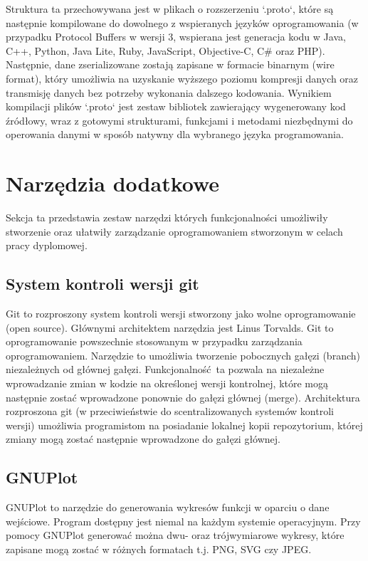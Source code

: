 \documentclass[a4paper,12pt,twoside,openany]{report}
\begin{document}
Struktura ta przechowywana jest w plikach o rozszerzeniu `.proto`, które są następnie kompilowane do dowolnego z wspieranych języków oprogramowania 
(w przypadku Protocol Buffers w wersji 3, wspierana jest generacja kodu w Java, C++, Python, Java Lite, Ruby, JavaScript, Objective-C, C\# oraz PHP).
Następnie, dane zserializowane zostają zapisane w formacie binarnym (wire format), który umożliwia na uzyskanie wyższego poziomu kompresji danych oraz transmisję danych 
bez potrzeby wykonania dalszego kodowania. 
Wynikiem kompilacji plików `.proto` jest zestaw bibliotek zawierający wygenerowany kod źródłowy, wraz z gotowymi strukturami, funkcjami i metodami niezbędnymi do 
operowania danymi w sposób natywny dla wybranego języka programowania.

\section{Narzędzia dodatkowe}

Sekcja ta przedstawia zestaw narzędzi których funkcjonalności umożliwiły stworzenie oraz ułatwiły zarządzanie oprogramowaniem stworzonym w celach
pracy dyplomowej. 

\subsection{System kontroli wersji git}
Git to rozproszony system kontroli wersji stworzony jako wolne oprogramowanie (open source). 
Głównymi architektem narzędzia jest Linus Torvalds. Git to oprogramowanie powszechnie stosowanym w przypadku zarządzania oprogramowaniem.
Narzędzie to umożliwia tworzenie pobocznych gałęzi (branch) niezależnych od głównej gałęzi. Funkcjonalność ta pozwala na niezależne wprowadzanie zmian
w kodzie na określonej wersji kontrolnej, które mogą następnie zostać wprowadzone ponownie do gałęzi głównej (merge).
Architektura rozproszona git (w przeciwieństwie do scentralizowanych systemów kontroli wersji) umożliwia programistom na posiadanie lokalnej kopii repozytorium,
której zmiany mogą zostać następnie wprowadzone do gałęzi głównej.

\subsection{GNUPlot}

GNUPlot to narzędzie do generowania wykresów funkcji w oparciu o dane wejściowe. Program dostępny jest niemal na każdym systemie operacyjnym.
Przy pomocy GNUPlot generować można dwu- oraz trójwymiarowe wykresy, które zapisane mogą zostać w różnych formatach t.j. PNG, SVG czy JPEG.
\end{document}
